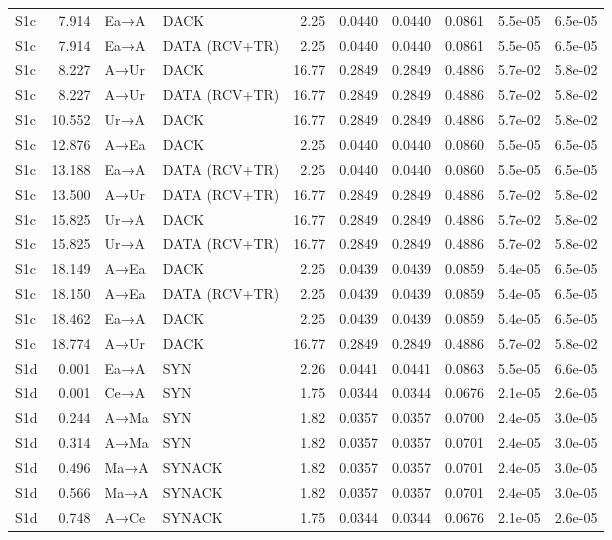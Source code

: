 \documentclass[10pt,letterpaper]{article}
\begin{document}
{\begin{longtable}{@{}lrllrrrrrr@{}}
S1c & 7.914 & Ea→A & DACK & 2.25 & 0.0440 & 0.0440 & 0.0861 & 5.5e-05 & 6.5e-05 \\
S1c & 7.914 & Ea→A & DATA (RCV+TR) & 2.25 & 0.0440 & 0.0440 & 0.0861 & 5.5e-05 & 6.5e-05 \\
S1c & 8.227 & A→Ur & DACK & 16.77 & 0.2849 & 0.2849 & 0.4886 & 5.7e-02 & 5.8e-02 \\
S1c & 8.227 & A→Ur & DATA (RCV+TR) & 16.77 & 0.2849 & 0.2849 & 0.4886 & 5.7e-02 & 5.8e-02 \\
S1c & 10.552 & Ur→A & DACK & 16.77 & 0.2849 & 0.2849 & 0.4886 & 5.7e-02 & 5.8e-02 \\
S1c & 12.876 & A→Ea & DACK & 2.25 & 0.0440 & 0.0440 & 0.0860 & 5.5e-05 & 6.5e-05 \\
S1c & 13.188 & Ea→A & DATA (RCV+TR) & 2.25 & 0.0440 & 0.0440 & 0.0860 & 5.5e-05 & 6.5e-05 \\
S1c & 13.500 & A→Ur & DATA (RCV+TR) & 16.77 & 0.2849 & 0.2849 & 0.4886 & 5.7e-02 & 5.8e-02 \\
S1c & 15.825 & Ur→A & DACK & 16.77 & 0.2849 & 0.2849 & 0.4886 & 5.7e-02 & 5.8e-02 \\
S1c & 15.825 & Ur→A & DATA (RCV+TR) & 16.77 & 0.2849 & 0.2849 & 0.4886 & 5.7e-02 & 5.8e-02 \\
S1c & 18.149 & A→Ea & DACK & 2.25 & 0.0439 & 0.0439 & 0.0859 & 5.4e-05 & 6.5e-05 \\
S1c & 18.150 & A→Ea & DATA (RCV+TR) & 2.25 & 0.0439 & 0.0439 & 0.0859 & 5.4e-05 & 6.5e-05 \\
S1c & 18.462 & Ea→A & DACK & 2.25 & 0.0439 & 0.0439 & 0.0859 & 5.4e-05 & 6.5e-05 \\
S1c & 18.774 & A→Ur & DACK & 16.77 & 0.2849 & 0.2849 & 0.4886 & 5.7e-02 & 5.8e-02 \\
S1d & 0.001 & Ea→A & SYN & 2.26 & 0.0441 & 0.0441 & 0.0863 & 5.5e-05 & 6.6e-05 \\
S1d & 0.001 & Ce→A & SYN & 1.75 & 0.0344 & 0.0344 & 0.0676 & 2.1e-05 & 2.6e-05 \\
S1d & 0.244 & A→Ma & SYN & 1.82 & 0.0357 & 0.0357 & 0.0700 & 2.4e-05 & 3.0e-05 \\
S1d & 0.314 & A→Ma & SYN & 1.82 & 0.0357 & 0.0357 & 0.0701 & 2.4e-05 & 3.0e-05 \\
S1d & 0.496 & Ma→A & SYNACK & 1.82 & 0.0357 & 0.0357 & 0.0701 & 2.4e-05 & 3.0e-05 \\
S1d & 0.566 & Ma→A & SYNACK & 1.82 & 0.0357 & 0.0357 & 0.0701 & 2.4e-05 & 3.0e-05 \\
S1d & 0.748 & A→Ce & SYNACK & 1.75 & 0.0344 & 0.0344 & 0.0676 & 2.1e-05 & 2.6e-05 \\

\end{longtable}}
\end{document}
